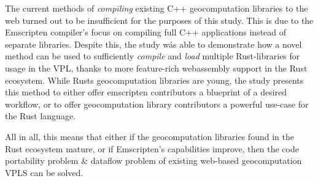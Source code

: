 The current methods of \emph{compiling} existing C++ geocomputation libraries to the web turned out to be insufficient for the purposes of this study.  
This is due to the Emscripten compiler's focus on compiling full C++ applications instead of separate libraries. 
Despite this, the study wás able to demonstrate how a novel method can be used to sufficiently \emph{compile} and \emph{load} multiple Rust-libraries for usage in the VPL, thanks to more feature-rich webassembly support in the Rust ecosystem. 
While Rusts geocomputation libraries are young, the study presents this method to either offer emscripten contributors a blueprint of a desired workflow, or to offer geocomputation library contributors a powerful use-case for the Rust language. 

All in all, this means that either if the geocomputation libraries found in the Rust ecosystem mature, or if Emscripten's capabilities improve, then the code portability problem \& dataflow problem of existing web-based geocomputation VPLS can be solved. 


